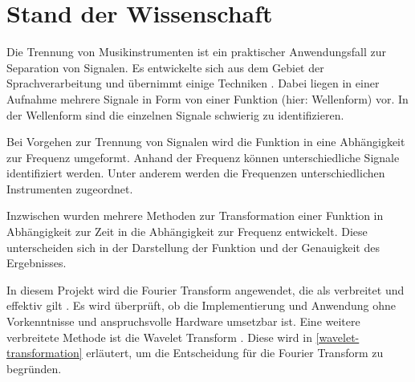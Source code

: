 \chapter{Stand der Wissenschaft}
\label{stand_der_wissenschaft}

Die Trennung von Musikinstrumenten ist ein praktischer Anwendungsfall zur Separation von Signalen. Es entwickelte sich aus dem Gebiet der Sprachverarbeitung und übernimmt einige Techniken \parencite{Mueller_2011}. Dabei liegen in einer Aufnahme mehrere Signale in Form von einer Funktion (hier: Wellenform) vor. In der Wellenform sind die einzelnen Signale schwierig zu identifizieren.

\par

Bei Vorgehen zur Trennung von Signalen wird die Funktion in eine Abhängigkeit zur Frequenz umgeformt. Anhand der Frequenz können unterschiedliche Signale identifiziert werden. Unter anderem werden die Frequenzen unterschiedlichen Instrumenten zugeordnet.

\par

Inzwischen wurden mehrere Methoden zur Transformation einer Funktion in Abhängigkeit zur Zeit in die Abhängigkeit zur Frequenz entwickelt. Diese unterscheiden sich in der Darstellung der Funktion und der Genauigkeit des Ergebnisses.

\par

In diesem Projekt wird die Fourier Transform angewendet, die als verbreitet und effektiv gilt \parencite{fourier_transform_importance}. Es wird überprüft, ob die Implementierung und Anwendung ohne Vorkenntnisse und anspruchsvolle Hardware umsetzbar ist. Eine weitere verbreitete Methode ist die Wavelet Transform \parencite{Guo_2022}. Diese wird in \cref{wavelet-transformation} erläutert, um die Entscheidung für die Fourier Transform zu begründen.



